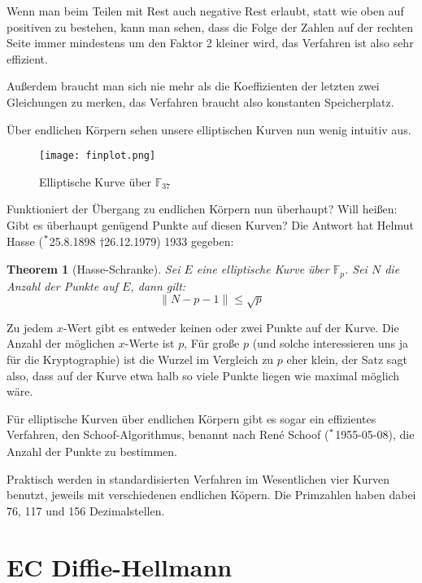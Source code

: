 \documentclass{article}
\newcommand{\F}{\mathbb{F}}
\newcounter{thm}
\newtheorem{theorem}[thm]{Theorem}
\begin{document}
Wenn man beim Teilen mit Rest auch negative Rest erlaubt, statt wie oben auf
positiven zu bestehen, kann man sehen, dass die Folge der Zahlen auf der
rechten Seite immer mindestens um den Faktor 2 kleiner wird, das Verfahren ist
also sehr effizient.

Außerdem braucht man sich nie mehr als die Koeffizienten der letzten zwei
Gleichungen zu merken, das Verfahren braucht also konstanten Speicherplatz.
\pagebreak


Über endlichen Körpern sehen unsere elliptischen Kurven nun wenig intuitiv
aus.
\begin{figure}[h]
  \centering
  \texttt{[image: finplot.png]}
  \caption{Elliptische Kurve über $\F_{37}$}
\end{figure}

Funktioniert der Übergang zu endlichen Körpern nun überhaupt? Will heißen:
Gibt es überhaupt genügend Punkte auf diesen Kurven? Die Antwort hat Helmut
Hasse ($\strut^*$25.8.1898  $\dagger$26.12.1979) 1933 gegeben:

\begin{theorem}[Hasse-Schranke]
    Sei $E$ eine elliptische Kurve über $\F_p$. Sei $N$ die Anzahl der Punkte
    auf $E$, dann gilt:
    \begin{equation}
      \| N - p - 1 \| \le \sqrt{p}
    \end{equation}
\end{theorem}

Zu jedem $x$-Wert gibt es entweder keinen oder zwei Punkte auf der Kurve. Die Anzahl
der möglichen $x$-Werte ist $p$, Für große $p$ (und solche interessieren uns
ja für die Kryptographie) ist die Wurzel im Vergleich zu $p$ eher klein,
der Satz sagt also, dass auf der Kurve etwa halb so viele Punkte liegen wie
maximal möglich wäre.

Für elliptische Kurven über endlichen Körpern gibt es sogar ein effizientes
Verfahren, den Schoof-Algorithmus, benannt nach René Schoof ($\strut^*$1955-05-08),
die Anzahl der Punkte zu bestimmen.

Praktisch werden in standardisierten Verfahren im Wesentlichen vier Kurven
benutzt, jeweils mit verschiedenen endlichen Köpern. Die Primzahlen haben
dabei 76, 117 und 156 Dezimalstellen.



\section{EC Diffie-Hellmann}
\end{document}

